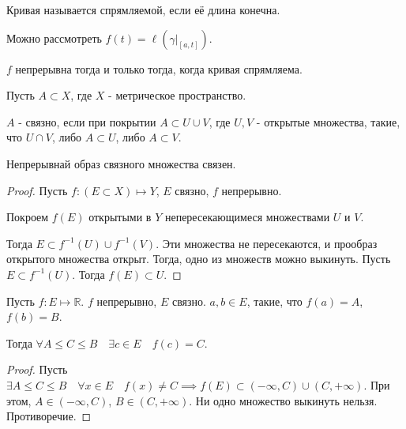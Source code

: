 \begin{definition} \thmslashn 

    Кривая называется спрямляемой, если её длина конечна.
\end{definition}
\begin{statement} \thmslashn

    Можно рассмотреть $f(t) = \ell\left(\left. \gamma\right|_{[a, t]}\right)$.

    $f$ непрерывна тогда и только тогда, когда кривая спрямляема.
\end{statement}
\begin{definition} \thmslashn 

    Пусть $A \subset X$, где $X$ - метрическое пространство.

    $A$ - связно, если при покрытии $A \subset U \cup V$, где $U, V$ - открытые множества, такие, что $U\cap V$, либо $A \subset U$, либо $A \subset V$.
\end{definition}
\begin{theorem} \thmslashn

    Непрерывнай образ связного множества связен.
    \begin{proof} \thmslashn
    
        Пусть $f : (E \subset X) \mapsto Y$, $E$ связно, $f$ непрерывно.

        Покроем $f(E)$ открытыми в $Y$ непересекающимеся множествами $U$ и $V$.

        Тогда $E \subset f^{-1}(U) \cup f^{-1}(V)$. Эти множества не пересекаются, и прообраз открытого множества открыт. Тогда, одно из множеств можно выкинуть. Пусть $E \subset f^{-1}(U)$. Тогда $f(E) \subset U$.
    \end{proof}
\end{theorem}
\begin{consequence} \thmslashn

    Пусть $f : E \mapsto \mathbb{R}$. $f$ непрерывно, $E$ связно. $a, b\in E$, такие, что $f(a) = A$, $f(b) = B$.

    Тогда $\forall{A \le C \le B}\quad \exists{c\in E}\quad f(c) = C$.

    \begin{proof} \thmslashn
    
        Пусть $\exists{A \le C \le B}\quad \forall{x\in E}\quad f(x) \neq C \implies f(E) \subset (-\infty, C) \cup (C, +\infty)$. При этом, $A\in (-\infty, C)$, $B\in (C, +\infty)$. Ни одно множество выкинуть нельзя. Противоречие.
    \end{proof}
\end{consequence}
